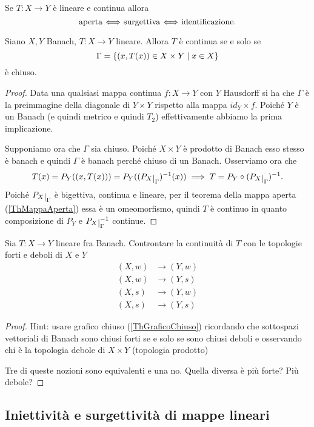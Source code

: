 \begin{remark}
Se $T:X\to Y$ \`e lineare e continua allora
\[\text{aperta $\Longleftrightarrow$ surgettiva $\Longleftrightarrow$ identificazione.}\]
\end{remark}

\begin{theorem}\label{ThGraficoChiuso}
Siano $X,Y$ Banach, $T:X\to Y$ lineare. Allora $T$ \`e continua se e solo se
\[\Gamma=\left\{{(x,T(x))\in X\times Y\mid x\in X}\right\}\]
\`e chiuso.
\end{theorem}
\begin{proof}
Data una qualsiasi mappa continua $f:X\to Y$ con $Y$ Hausdorff si ha che $\Gamma$ \`e la preimmagine della diagonale di $Y\times Y$ rispetto alla mappa $id_Y\times f$. Poich\'e $Y$ \`e un Banach (e quindi metrico e quindi $T_2$) effettivamente abbiamo la prima implicazione.
\smallskip

Supponiamo ora che $\Gamma$ sia chiuso. Poich\'e $X\times Y$ \`e prodotto di Banach esso stesso \`e banach e quindi $\Gamma$ \`e banach perch\'e chiuso di un Banach. Osserviamo ora che
\[T(x)=P_Y((x,T(x)))=P_Y((P_X\res{\Gamma})\ii(x))\implies T=P_Y\circ(P_X\res{\Gamma})\ii.\]
Poich\'e $P_X\res{\Gamma}$ \`e bigettiva, continua e lineare, per il teorema della mappa aperta (\ref{ThMappaAperta}) essa \`e un omeomorfismo, quindi $T$ \`e continuo in quanto composizione di $P_Y$ e $P_X\res{\Gamma}\ii$ continue.
\end{proof}

\begin{exercise}
Sia $T:X\to Y$ lineare fra Banach. Controntare la continuit\`a di $T$ con le topologie forti e deboli di $X$ e $Y$
\begin{align*}
(X,w)&\to (Y,w)\\
(X,w)&\to (Y,s)\\
(X,s)&\to (Y,w)\\
(X,s)&\to (Y,s)
\end{align*}
\end{exercise}
\begin{proof}
Hint: usare grafico chiuso (\ref{ThGraficoChiuso}) ricordando che sottospazi vettoriali di Banach sono chiusi forti se e solo se sono chiusi deboli e osservando chi \`e la topologia debole di $X\times Y$ (topologia prodotto)

Tre di queste nozioni sono equivalenti e una no. Quella diversa \`e pi\`u forte? Pi\`u debole?
\end{proof}

\subsection{Iniettivit\`a e surgettivit\`a di mappe lineari}

